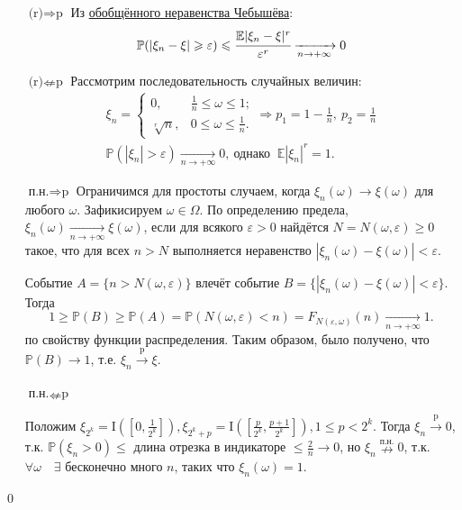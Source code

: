 \documentclass[oneside,final,14pt]{extreport}
\renewenvironment{proof}{{\bfseries Доказательство.}}{\qed}
\theoremstyle{plain}
\theoremstyle{definition}
\theoremstyle{named}
\begin{document}
\begin{proof}
    \begin{itemize}
        \item[$\text{(r)} \Rightarrow \text{p}$] Из \hyperlink{cheb}{обобщённого неравенства Чебышёва}:
    \begin{equation*}
        \mathbb{P}(|\xi_n - \xi| \geqslant \varepsilon) \leqslant \cfrac{\mathbb{E}|\xi_n - \xi|^{r}}{\varepsilon^{r}} \xrightarrow[n \to +\infty]{} 0
    \end{equation*}
    
    \item[$\text{(r)} \nLeftarrow \text{p}$] Рассмотрим последовательность случайных величин:
    \begin{gather*}
        \xi_n = 
        \begin{cases}
            0, & \frac{1}{n} \leqslant \omega \leqslant 1; \\
            \sqrt[r]{n}, & 0 \leqslant \omega \leqslant \frac{1}{n}.
        \end{cases}
        \Rightarrow p_1 = 1 - \frac{1}{n},~ p_2 = \frac{1}{n} \\
        \mathbb{P}(|\xi_n| > \varepsilon) \xrightarrow[n \to +\infty]{} 0,~ \text{однако $~\mathbb{E}|\xi_n|^{r} = 1$}.
    \end{gather*}
    
    \item[$\text{п.н.} \Rightarrow \text{p}$]
    Ограничимся для простоты случаем, когда $\xi_n(\omega) \rightarrow \xi(\omega)$ для любого $\omega$. Зафикисируем $\omega \in \Omega.$ По определению предела, $\xi_n(\omega) \xrightarrow[n \to +\infty]{} \xi(\omega)$, если для всякого $\varepsilon > 0$ найдётся $N = N(\omega, \varepsilon) \geqslant 0$ такое, что для всех $n > N$ выполняется неравенство $|\xi_n(\omega) - \xi(\omega)| < \varepsilon$.
    
    Событие $A = \{n > N(\omega,\varepsilon) \}$ влечёт событие $B = \{|\xi_n(\omega) - \xi(\omega)| < \varepsilon \}$. Тогда 
    $$1 \geqslant \mathbb{P}(B) \geqslant \mathbb{P}(A)=\mathbb{P}(N(\omega, \varepsilon)<n)=F_{N(\varepsilon, \omega)}(n) \xrightarrow[n \to +\infty]{} 1.$$ по свойству функции распределения. Таким образом, было получено, что $\mathbb{P}(B) \rightarrow 1$, т.е. $\xi_n \xrightarrow[]{\text{p}} \xi.$
    
    \item[$\text{п.н.} \nLeftarrow \text{p}$]
    
    Положим $\xi_{2^{k}}=\mathrm{I}\left(\left[0, \frac{1}{2^{k}}\right]\right), \xi_{2^{k}+p}=\mathrm{I}\left(\left[\frac{p}{2^{k}}, \frac{p+1}{2^{k}}\right]\right), 1 \leqslant p<2^{k}.$ Тогда $\xi_n \xrightarrow[]{\text{p}} 0$, т.к. $\mathbb{P}(\xi_n > 0) \leqslant$ длина отрезка в индикаторе $\leqslant \frac{2}{n} \rightarrow 0$, но $\xi_n \overset{\text{п.н.}}{\nrightarrow} 0$, т.к. $\forall \omega \quad \exists$ бесконечно много $n$, таких что $\xi_n(\omega) = 1.$
    

\end{itemize}
\end{proof}
\end{document}
